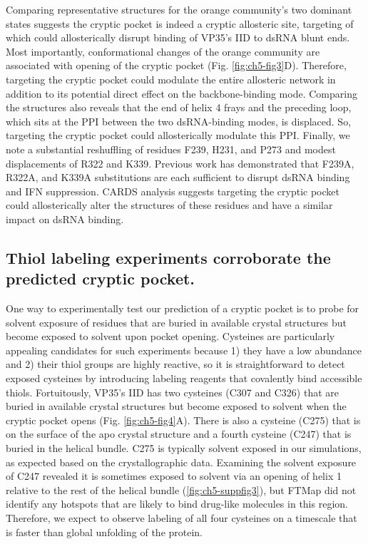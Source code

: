 \documentclass[../main.tex]{subfiles}
\begin{document}
        Comparing representative structures for the orange community’s two dominant states suggests the cryptic pocket is indeed a cryptic allosteric site, targeting of which could allosterically disrupt binding of VP35’s IID to dsRNA blunt ends. Most importantly, conformational changes of the orange community are associated with opening of the cryptic pocket (Fig. \ref{fig:ch5-fig3}D). Therefore, targeting the cryptic pocket could modulate the entire allosteric network in addition to its potential direct effect on the backbone-binding mode. Comparing the structures also reveals that the end of helix 4 frays and the preceding loop, which sits at the PPI between the two dsRNA-binding modes, is displaced. So, targeting the cryptic pocket could allosterically modulate this PPI. Finally, we note a substantial reshuffling of residues F239, H231, and P273 and modest displacements of R322 and K339. Previous work has demonstrated that F239A, R322A,  and K339A substitutions are each sufficient to disrupt dsRNA binding and IFN suppression\cite{leung_structural_2010}. CARDS analysis suggests targeting the cryptic pocket could allosterically alter the structures of these residues and have a similar impact on dsRNA binding.

    \subsection{Thiol labeling experiments corroborate the predicted cryptic pocket.}
        One way to experimentally test our prediction of a cryptic pocket is to probe for solvent exposure of residues that are buried in available crystal structures but become exposed to solvent upon pocket opening. Cysteines are particularly appealing candidates for such experiments because 1) they have a low abundance and 2) their thiol groups are highly reactive, so it is straightforward to detect exposed cysteines by introducing labeling reagents that covalently bind accessible thiols. Fortuitously, VP35’s IID has two cysteines (C307 and C326) that are buried in available crystal structures but become exposed to solvent when the cryptic pocket opens (Fig. \ref{fig:ch5-fig4}A). There is also a cysteine (C275) that is on the surface of the apo crystal structure\cite{leung_structure_2009} and a fourth cysteine (C247) that is buried in the helical bundle. C275 is typically solvent exposed in our simulations, as expected based on the crystallographic data. Examining the solvent exposure of C247 revealed it is sometimes exposed to solvent via an opening of helix 1 relative to the rest of the helical bundle (\ref{fig:ch5-suppfig3}), but FTMap did not identify any hotspots that are likely to bind drug-like molecules in this region. Therefore, we expect to observe labeling of all four cysteines on a timescale that is faster than global unfolding of the protein.
\end{document}
